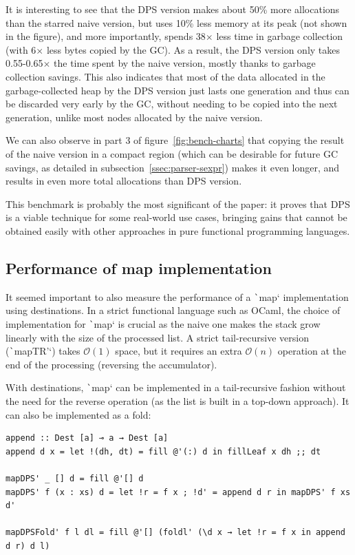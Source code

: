 \documentclass[english]{jflart}
\begin{document}
It is interesting to see that the DPS version makes about 50\% more allocations than the starred naive version, but uses 10\% less memory at its peak (not shown in the figure), and more importantly, spends 38$\times$ less time in garbage collection (with 6$\times$ less bytes copied by the GC). As a result, the DPS version only takes 0.55-0.65$\times$ the time spent by the naive version, mostly thanks to garbage collection savings. This also indicates that most of the data allocated in the garbage-collected heap by the DPS version just lasts one generation and thus can be discarded very early by the GC, without needing to be copied into the next generation, unlike most nodes allocated by the naive version.

We can also observe in part 3 of figure~\ref{fig:bench-charts} that copying the result of the naive version in a compact region (which can be desirable for future GC savings, as detailed in subsection~\ref{ssec:parser-sexpr}) makes it even longer, and results in even more total allocations than DPS version.

This benchmark is probably the most significant of the paper: it proves that DPS is a viable technique for some real-world use cases, bringing gains that cannot be obtained easily with other approaches in pure functional programming languages.

\subsection{Performance of map implementation}\label{ssec:benchmark-map}

It seemed important to also measure the performance of a \texttt`map` implementation using destinations. In a strict functional language such as OCaml, the choice of implementation for \texttt`map` is crucial as the naive one makes the stack grow linearly with the size of the processed list. A strict tail-recursive version (\texttt`mapTR'`) takes $\mathcal{O}(1)$ space, but it requires an extra $\mathcal{O}(n)$ operation at the end of the processing (reversing the accumulator). 

With destinations, \texttt`map` can be implemented in a tail-recursive fashion without the need for the reverse operation (as the list is built in a top-down approach). It can also be implemented as a fold:
{\small
\begin{verbatim}
append :: Dest [a] ⊸ a → Dest [a]
append d x = let !(dh, dt) = fill @'(:) d in fillLeaf x dh ;; dt

mapDPS' _ [] d = fill @'[] d
mapDPS' f (x : xs) d = let !r = f x ; !d' = append d r in mapDPS' f xs d'

mapDPSFold' f l dl = fill @'[] (foldl' (\d x → let !r = f x in append d r) d l)
\end{verbatim}
}
\end{document}
